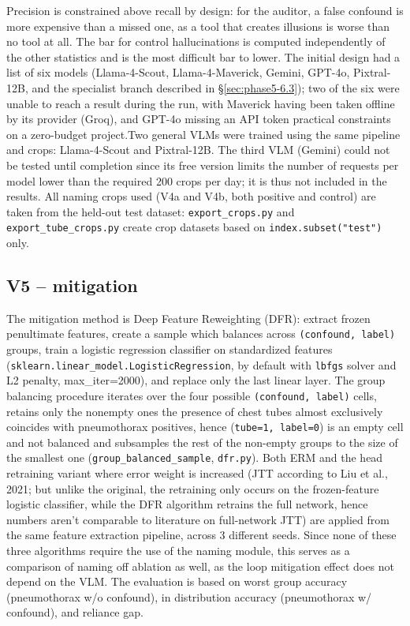 \documentclass{ieeeaccess}
\begin{document}
Precision is constrained above recall by design: for the auditor, a false confound
is more expensive than a missed one, as a tool that creates illusions is
worse than no tool at all. The bar for control hallucinations is computed
independently of the other statistics and is the most difficult bar to lower.
The initial design had a list of six models (Llama-4-Scout,
Llama-4-Maverick, Gemini, GPT-4o, Pixtral-12B, and the specialist branch
described in \S\ref{sec:phase5-6.3}); two of the six were unable to reach a
result during the run, with Maverick having been taken offline by its provider
(Groq), and GPT-4o missing an API token  practical constraints on a zero-budget
project.Two general VLMs were trained using the same pipeline and crops: Llama-4-Scout and Pixtral-12B. The third VLM (Gemini) could not be tested until completion since its free version limits the number of requests per model lower than the required 200 crops per day; it is thus not included in the results. All naming crops used (V4a and V4b, both positive and control) are taken from the held-out test dataset: \texttt{export\_crops.py} and \texttt{export\_tube\_crops.py} create crop datasets based on \texttt{index.subset("test")} only.

\subsection{V5 -- mitigation}
The mitigation method is Deep Feature Reweighting (DFR): extract frozen penultimate
features, create a sample which balances across \texttt{(confound, label)}
groups, train a logistic regression classifier on standardized features
(\texttt{sklearn.linear\_model.LogisticRegression},
by default with \texttt{lbfgs} solver and L2 penalty,
max\_iter=2000), and replace only the last linear layer. The group balancing procedure iterates over the four possible \texttt{(confound, label)} cells, retains only the nonempty ones  the presence of chest tubes almost exclusively coincides with pneumothorax positives, hence
(\texttt{tube=1, label=0}) is an empty cell and not balanced  and
subsamples the rest of the non-empty groups to the size of the smallest one
(\texttt{group\_balanced\_sample}, \texttt{dfr.py}). Both ERM and
the head retraining variant where error weight is increased (JTT according to
Liu et al., 2021; but unlike the original, the retraining only occurs on the
frozen-feature logistic classifier, while the DFR algorithm retrains the full
network, hence numbers aren't comparable to literature on full-network JTT) are
applied from the same feature extraction pipeline, across 3 different seeds. Since
none of these three algorithms require the use of the naming module, this serves
as a comparison of naming off ablation as well, as the loop mitigation effect
does not depend on the VLM. The evaluation is based on worst group accuracy
(pneumothorax w/o confound), in distribution accuracy (pneumothorax w/ confound),
and reliance gap.
\end{document}
